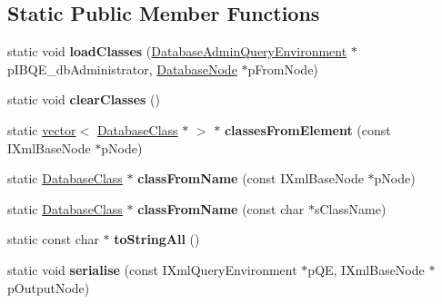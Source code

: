 \subsection*{\-Static \-Public \-Member \-Functions}
\begin{DoxyCompactItemize}
\item 
\hypertarget{classgeneral__server_1_1DatabaseClass_a3199a3a0afce8d1ddbd6b0ae88239e99}{static void {\bfseries load\-Classes} (\hyperlink{classgeneral__server_1_1DatabaseAdminQueryEnvironment}{\-Database\-Admin\-Query\-Environment} $\ast$p\-I\-B\-Q\-E\-\_\-db\-Administrator, \hyperlink{classgeneral__server_1_1DatabaseNode}{\-Database\-Node} $\ast$p\-From\-Node)}\label{classgeneral__server_1_1DatabaseClass_a3199a3a0afce8d1ddbd6b0ae88239e99}

\item 
\hypertarget{classgeneral__server_1_1DatabaseClass_aa15f1c30ca76a072ce4e9f85df5b48c4}{static void {\bfseries clear\-Classes} ()}\label{classgeneral__server_1_1DatabaseClass_aa15f1c30ca76a072ce4e9f85df5b48c4}

\item 
\hypertarget{classgeneral__server_1_1DatabaseClass_a56786b1504179d0f321205aed49e48ab}{static \hyperlink{classvector}{vector}$<$ \hyperlink{classgeneral__server_1_1DatabaseClass}{\-Database\-Class} $\ast$ $>$ $\ast$ {\bfseries classes\-From\-Element} (const \-I\-Xml\-Base\-Node $\ast$p\-Node)}\label{classgeneral__server_1_1DatabaseClass_a56786b1504179d0f321205aed49e48ab}

\item 
\hypertarget{classgeneral__server_1_1DatabaseClass_a4201f4482d52846f2cd94ea54a7b29e2}{static \hyperlink{classgeneral__server_1_1DatabaseClass}{\-Database\-Class} $\ast$ {\bfseries class\-From\-Name} (const \-I\-Xml\-Base\-Node $\ast$p\-Node)}\label{classgeneral__server_1_1DatabaseClass_a4201f4482d52846f2cd94ea54a7b29e2}

\item 
\hypertarget{classgeneral__server_1_1DatabaseClass_af955a64ada21138b915cf4e3058da2c6}{static \hyperlink{classgeneral__server_1_1DatabaseClass}{\-Database\-Class} $\ast$ {\bfseries class\-From\-Name} (const char $\ast$s\-Class\-Name)}\label{classgeneral__server_1_1DatabaseClass_af955a64ada21138b915cf4e3058da2c6}

\item 
\hypertarget{classgeneral__server_1_1DatabaseClass_a447e8962fb920c9c485faff0a092bdc2}{static const char $\ast$ {\bfseries to\-String\-All} ()}\label{classgeneral__server_1_1DatabaseClass_a447e8962fb920c9c485faff0a092bdc2}

\item 
\hypertarget{classgeneral__server_1_1DatabaseClass_a93ef969f8537711642b5a5cd7c629d06}{static void {\bfseries serialise} (const \-I\-Xml\-Query\-Environment $\ast$p\-Q\-E, \-I\-Xml\-Base\-Node $\ast$p\-Output\-Node)}\label{classgeneral__server_1_1DatabaseClass_a93ef969f8537711642b5a5cd7c629d06}

\end{DoxyCompactItemize}
